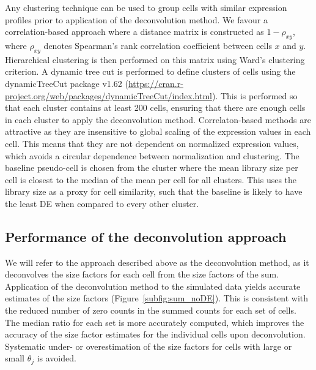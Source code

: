 \documentclass{article}
\begin{document}
Any clustering technique can be used to group cells with similar expression profiles prior to application of the deconvolution method.
We favour a correlation-based approach where a distance matrix is constructed as $1-\rho_{xy}$,
    where $\rho_{xy}$ denotes Spearman's rank correlation coefficient between cells $x$ and $y$.
Hierarchical clustering is then performed on this matrix using Ward's clustering criterion.
A dynamic tree cut is performed to define clusters of cells using the dynamicTreeCut package v1.62 (\url{https://cran.r-project.org/web/packages/dynamicTreeCut/index.html}).
This is performed so that each cluster contains at least 200 cells, ensuring that there are enough cells in each cluster to apply the deconvolution method.
Correlaton-based methods are attractive as they are insensitive to global scaling of the expression values in each cell.
This means that they are not dependent on normalized expression values, which avoids a circular dependence between normalization and clustering.
The baseline pseudo-cell is chosen from the cluster where the mean library size per cell is closest to the median of the mean per cell for all clusters.
This uses the library size as a proxy for cell similarity, such that the baseline is likely to have the least DE when compared to every other cluster.

\subsection{Performance of the deconvolution approach}
We will refer to the approach described above as the deconvolution method, as it deconvolves the size factors for each cell from the size factors of the sum.
Application of the deconvolution method to the simulated data yields accurate estimates of the size factors (Figure~\ref{subfig:sum_noDE}).
This is consistent with the reduced number of zero counts in the summed counts for each set of cells.
The median ratio for each set is more accurately computed, which improves the accuracy of the size factor estimates for the individual cells upon deconvolution.
Systematic under- or overestimation of the size factors for cells with large or small $\theta_j$ is avoided.
\end{document}
